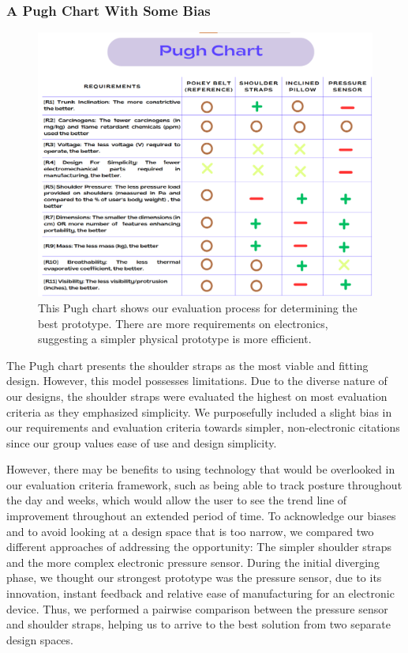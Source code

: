 \documentclass[11pt]{article}
\begin{document}
\subsubsection{A Pugh Chart With Some Bias}

\begin{figure}[H]
    \centering
            \includegraphics[scale=0.5]{image.png}
                \caption{This Pugh chart shows our evaluation process for determining the best prototype. There are more requirements on electronics, suggesting a simpler physical prototype is more efficient.}
            \label{fig:pughChart}
\end{figure}

The Pugh chart presents the shoulder straps as the most viable and fitting design. However, this model possesses limitations. Due to the diverse nature of our designs, the shoulder straps were evaluated the highest on most evaluation criteria as they emphasized simplicity. We purposefully included a slight bias in our requirements and evaluation criteria towards simpler, non-electronic citations since our group values ease of use and design simplicity.

However, there may be benefits to using technology that would be overlooked in our evaluation criteria framework, such as being able to track posture throughout the day and weeks, which would allow the user to see the trend line of improvement throughout an extended period of time. To acknowledge our biases and to avoid looking at a design space that is too narrow, we compared two different approaches of addressing the opportunity: The simpler shoulder straps and the more complex electronic pressure sensor. During the initial diverging phase, we thought our strongest prototype was the pressure sensor, due to its innovation, instant feedback and relative ease of manufacturing for an electronic device. Thus, we performed a pairwise comparison between the pressure sensor and shoulder straps, helping us to arrive to the best solution from two separate design spaces. 
\end{document}
